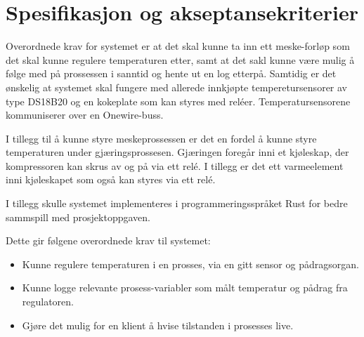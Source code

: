 \section{Spesifikasjon og akseptansekriterier}

Overordnede krav for systemet er at det skal kunne ta inn ett meske-forløp som det skal kunne regulere temperaturen etter, samt at det sakl kunne være mulig å følge med på prossessen i sanntid og hente ut en log etterpå.
Samtidig er det ønskelig at systemet skal fungere med allerede innkjøpte temperetursensorer av type DS18B20 og en kokeplate som kan styres med reléer. Temperatursensorene kommuniserer over en Onewire-buss. 

I tillegg til å kunne styre meskeprossessen er det en fordel å kunne styre temperaturen under gjæringsprossesen. Gjæringen foregår inni et kjøleskap, der kompressoren kan skrus av og på via ett relé. I tillegg er det ett varmeelement inni kjøleskapet som også kan styres via ett relé.

I tillegg skulle systemet implementeres i programmeringsspråket Rust for bedre sammspill med prosjektoppgaven.

Dette gir følgene overordnede krav til systemet:
\begin{itemize}
    \item Kunne regulere temperaturen i en prosses, via en gitt sensor og pådragsorgan.
    \item Kunne logge relevante prosess-variabler som målt temperatur og pådrag fra regulatoren.
    \item Gjøre det mulig for en klient  å hvise tilstanden i prosesses live.
\end{itemize}